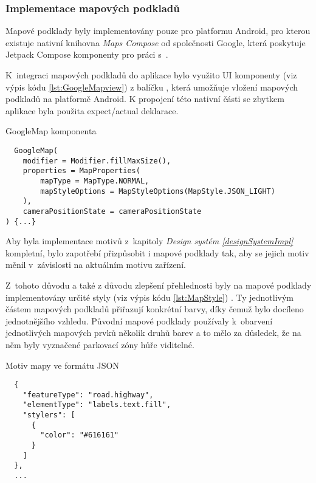 \subsubsection*{Implementace mapových podkladů}
Mapové podklady byly implementovány pouze pro platformu Android, pro kterou existuje nativní knihovna \textit{Maps Compose} od společnosti Google, 
která poskytuje Jetpack Compose komponenty pro práci s~.

K~integraci mapových podkladů do aplikace bylo využito UI komponenty  (viz výpis kódu \ref{lst:GoogleMapview}) z balíčku 
, která umožňuje vložení mapových podkladů na platformě Android. K propojení této nativní části 
se zbytkem aplikace byla použita expect/actual deklarace.


\begin{listing}[H]
\caption{GoogleMap komponenta}\label{lst:GoogleMapview}
\begin{verbatim}
  GoogleMap(
    modifier = Modifier.fillMaxSize(),
    properties = MapProperties(
        mapType = MapType.NORMAL,
        mapStyleOptions = MapStyleOptions(MapStyle.JSON_LIGHT)
    ),
    cameraPositionState = cameraPositionState
) {...}
\end{verbatim}
\end{listing}


Aby byla implementace motivů z~kapitoly \textit{Design systém \ref{designSystemImpl}} kompletní, bylo zapotřebí přizpůsobit i mapové podklady tak,
aby se jejich motiv měnil v~závislosti na aktuálním motivu zařízení.

Z~tohoto důvodu a také z důvodu zlepšení přehlednosti byly na mapové podklady implementovány určité styly (viz výpis kódu \ref{lst:MapStyle}) \cite{googleStyles}.
Ty jednotlivým částem mapových podkladů přiřazují konkrétní barvy, díky čemuž bylo docíleno jednotnějšího vzhledu. Původní mapové podklady
používaly k~obarvení jednotlivých mapových prvků několik druhů barev a to mělo za důsledek, že na něm byly vyznačené parkovací zóny hůře viditelné.

\begin{listing}[H]
\caption{Motiv mapy ve formátu JSON}\label{lst:MapStyle}
\begin{verbatim}
  {
    "featureType": "road.highway",
    "elementType": "labels.text.fill",
    "stylers": [
      {
        "color": "#616161"
      }
    ]
  },
  ...
\end{verbatim}
\end{listing}

